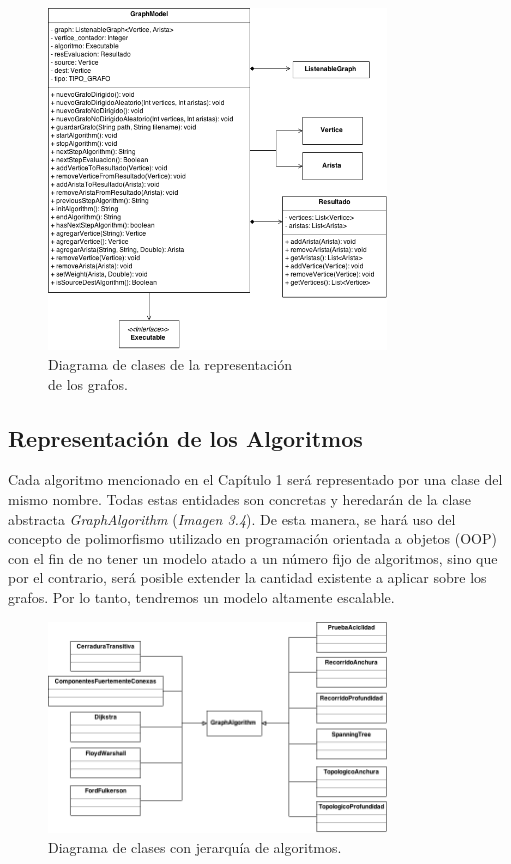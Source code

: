 \documentclass{book}
\begin{document}
\begin{figure}[H]
	\centering
	\includegraphics[width=0.8\textwidth]{images/01-03.png}
	\medskip
	\caption{Diagrama de clases de la representación \\ de los grafos.}
	\medskip
\end{figure}
\bigskip



\subsection{Representación de los Algoritmos}

Cada algoritmo mencionado en el Capítulo 1 será representado por una clase del mismo nombre. Todas estas entidades son concretas y heredarán de la clase abstracta \textit{GraphAlgorithm} (\textit{Imagen 3.4}). De esta manera, se hará uso del concepto de polimorfismo utilizado en programación orientada a objetos (OOP) con el fin de no tener un modelo atado a un número fijo de algoritmos, sino que por el contrario, será posible extender la cantidad existente a aplicar sobre los grafos. Por lo tanto, tendremos un modelo altamente escalable.
\bigskip


\begin{figure}[H]
	\centering
	\includegraphics[width=0.8\textwidth]{images/01-04.png}
	\medskip
	\caption{Diagrama de clases con jerarquía de algoritmos.}
	\medskip
\end{figure}
\bigskip
\end{document}

